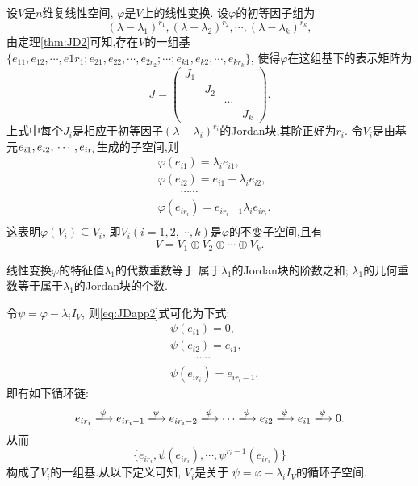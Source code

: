 设$V$是$n$维复线性空间, $\varphi$是$V$上的线性变换.
设$\varphi$的初等因子组为
\begin{equation}\label{eq:JDapp1}
  (\lambda-\lambda_1)^{r_1},(\lambda-\lambda_2)^{r_2},\cdots,
  (\lambda-\lambda_k)^{r_k},
\end{equation}
由定理\ref{thm:JD2}可知,存在$V$的一组基
$\{e_{11},e_{12},\cdots,e{1r_1};e_{21},e_{22},\cdots,e_{2r_2};\cdots;e_{k1},e_{k2},\cdots,e_{kr_k}\}$,
使得$\varphi$在这组基下的表示矩阵为
\[J=
  \begin{pmatrix}
    J_1&&&\\
       &J_2&&\\
       &&\cdots&\\
    &&&J_k
  \end{pmatrix}.\]
上式中每个$J_i$是相应于初等因子$(\lambda-\lambda_i)^{r_i}$的Jordan块,其阶正好为$r_i$.
令$V_i$是由基元$e_{i1}, e_{i2},\\ \cdots, e_{ir_i}$生成的子空间,则
\begin{equation}\label{eq:JDapp2}
  \begin{split}
   & \varphi(e_{i1})  = \lambda_ie_{i1},\\
   & \varphi(e_{i2})  = e_{i1}+\lambda_ie_{i2},\\
                   &\hspace{2em} \cdots\cdots\\
   & \varphi(e_{ir_i})  = e_{ir_i-1}\lambda_ie_{ir_i}.\\
  \end{split}
\end{equation}
这表明$\varphi(V_i)\subseteq V_i$,
即$V_i(i=1,2,\cdots,k)$是$\varphi$的不变子空间,且有
\[V=V_1\oplus V_2 \oplus\cdots\oplus V_k.\]

\begin{theorem}\label{thm:JDapp1}
  线性变换$\varphi$的特征值$\lambda_1$的代数重数等于
  属于$\lambda_1$的Jordan块的阶数之和;
  $\lambda_1$的几何重数等于属于$\lambda_1$的Jordan块的个数.
\end{theorem}

令$\psi=\varphi-\lambda_i I_V$,
则\eqref{eq:JDapp2}式可化为下式:
\begin{equation}\label{eq:JDapp3}
  \begin{split}
    & \psi(e_{i1})=0,\\
    & \psi(e_{i2})=e_{i1},\\
    & \hspace{2em} \cdots\cdots\\
    & \psi(e_{ir_i})=e_{ir_i-1}.
  \end{split}
\end{equation}
即有如下循环链:
\[e_{ir_i} \xlongrightarrow {\psi} e_{ir_i-1} \xlongrightarrow {\psi}
  e_{ir_i-2} \xlongrightarrow {\psi} \cdots \xlongrightarrow {\psi}
  e_{i2} \xlongrightarrow {\psi} e_{i1} \xlongrightarrow {\psi} 0.\]
从而
\[\{e_{ir_i},\psi(e_{ir_i}),\cdots,\psi^{r_i-1}(e_{ir_i})\}\]
构成了$V_i$的一组基.从以下定义可知, $V_i$是关于
$\psi=\varphi-\lambda_i I_V$的循环子空间.

